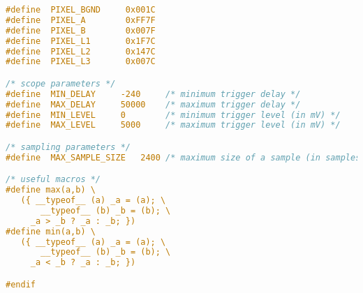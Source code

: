 \begin{lstlisting}[language=C]
#define	 PIXEL_BGND		0x001C
#define	 PIXEL_A		0xFF7F
#define	 PIXEL_B		0x007F
#define	 PIXEL_L1		0x1F7C
#define	 PIXEL_L2		0x147C
#define	 PIXEL_L3		0x007C

/* scope parameters */
#define  MIN_DELAY	   -240		/* minimum trigger delay */
#define  MAX_DELAY     50000	/* maximum trigger delay */
#define  MIN_LEVEL     0		/* minimum trigger level (in mV) */
#define  MAX_LEVEL     5000		/* maximum trigger level (in mV) */

/* sampling parameters */
#define  MAX_SAMPLE_SIZE   2400 /* maximum size of a sample (in samples) */

/* useful macros */
#define max(a,b) \
   ({ __typeof__ (a) _a = (a); \
       __typeof__ (b) _b = (b); \
     _a > _b ? _a : _b; })
#define min(a,b) \
   ({ __typeof__ (a) _a = (a); \
       __typeof__ (b) _b = (b); \
     _a < _b ? _a : _b; })

#endif
\end{lstlisting}

